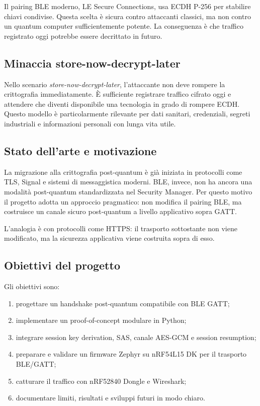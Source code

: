 \documentclass[11pt,a4paper]{article}
\providecommand{\tightlist}{\setlength{\itemsep}{0pt}\setlength{\parskip}{0pt}}
\begin{document}
Il pairing BLE moderno, LE Secure Connections, usa ECDH P-256 per
stabilire chiavi condivise. Questa scelta è sicura contro attaccanti
classici, ma non contro un quantum computer sufficientemente potente. La
conseguenza è che traffico registrato oggi potrebbe essere decrittato in
futuro.

\subsection{Minaccia
store-now-decrypt-later}\label{minaccia-store-now-decrypt-later}

Nello scenario \emph{store-now-decrypt-later}, l'attaccante non deve
rompere la crittografia immediatamente. È sufficiente registrare
traffico cifrato oggi e attendere che diventi disponibile una tecnologia
in grado di rompere ECDH. Questo modello è particolarmente rilevante per
dati sanitari, credenziali, segreti industriali e informazioni personali
con lunga vita utile.

\subsection{Stato dell'arte e
motivazione}\label{stato-dellarte-e-motivazione}

La migrazione alla crittografia post-quantum è già iniziata in
protocolli come TLS, Signal e sistemi di messaggistica moderni. BLE,
invece, non ha ancora una modalità post-quantum standardizzata nel
Security Manager. Per questo motivo il progetto adotta un approccio
pragmatico: non modifica il pairing BLE, ma costruisce un canale sicuro
post-quantum a livello applicativo sopra GATT.

L'analogia è con protocolli come HTTPS: il trasporto sottostante non
viene modificato, ma la sicurezza applicativa viene costruita sopra di
esso.

\subsection{Obiettivi del progetto}\label{obiettivi-del-progetto}

Gli obiettivi sono:

\begin{enumerate}
\def\labelenumi{\arabic{enumi}.}
\tightlist
\item
  progettare un handshake post-quantum compatibile con BLE GATT;
\item
  implementare un proof-of-concept modulare in Python;
\item
  integrare session key derivation, SAS, canale AES-GCM e session
  resumption;
\item
  preparare e validare un firmware Zephyr su nRF54L15 DK per il
  trasporto BLE/GATT;
\item
  catturare il traffico con nRF52840 Dongle e Wireshark;
\item
  documentare limiti, risultati e sviluppi futuri in modo chiaro.
\end{enumerate}
\end{document}
